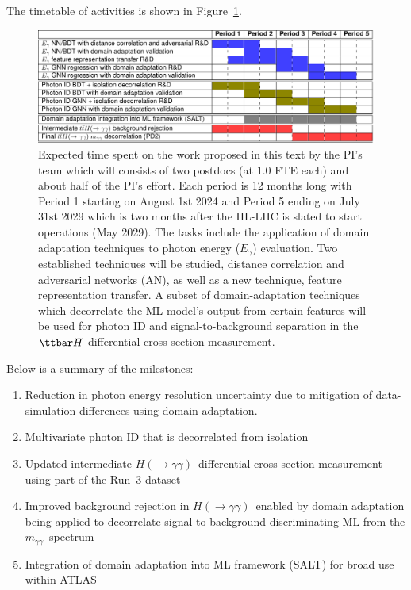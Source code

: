 \documentclass[letter, USenglish, 11pt, subfigure]{article}
\newcommand{\myy}{\ensuremath{m_{\gamma\gamma}}}
\newcommand{\hyy}{\ensuremath{H(\to\gamma\gamma)}}
\begin{document}
The timetable of activities is shown in Figure~\ref{fig:timetable}.
\begin{figure}[!htbp]
  \centering
  \includegraphics[width=\textwidth]{figures/timeline.pdf}
  \caption{Expected time spent on the work proposed in this text by the PI's team which will consists of two postdocs (at 1.0 FTE each) and about half of the PI's effort. Each period is 12 months long with Period 1 starting on August 1st 2024 and Period 5 ending on July 31st 2029 which is two months after the HL-LHC is slated to start operations (May 2029). The tasks include the application of domain adaptation  techniques to photon energy ($E_{\gamma}$) evaluation. Two established techniques will be studied, distance correlation and adversarial networks (AN), as well as a new technique, feature representation transfer. A subset of domain-adaptation techniques which decorrelate the ML model's output from certain features will be used for photon ID and signal-to-background separation in the $\ttbar H$ differential cross-section measurement.
  }
  \label{fig:timetable}
\end{figure}

Below is a summary of the milestones:
\begin{enumerate}
\item Reduction in photon energy resolution uncertainty due to mitigation of data-simulation differences using domain adaptation.
\item Multivariate photon ID that is decorrelated from isolation
\item Updated intermediate \hyy\ differential cross-section measurement using part of the Run~3 dataset
\item Improved background rejection in \hyy\ enabled by domain adaptation being applied to decorrelate signal-to-background discriminating ML from the \myy\ spectrum
\item Integration of domain adaptation into ML framework (SALT) for broad use within ATLAS
\end{enumerate}
\end{document}
